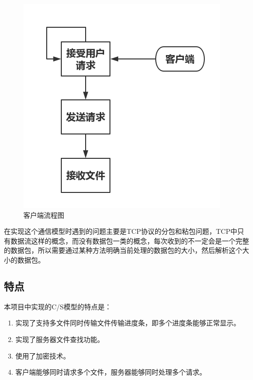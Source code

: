 \documentclass[15pt]{ctexart}
\begin{document}
\begin{figure}[H]
\begin{minipage}{0.45\linewidth}
		    		\includegraphics[width=1\linewidth]{imgs/client.png}
		    		\caption{客户端流程图}
		    		\label{fig:client}
	    		\end{minipage}
	    	\end{figure}
	    	\par 在实现这个通信模型时遇到的问题主要是TCP协议的分包和粘包问题，TCP中只有数据流这样的概念，而没有数据包一类的概念，每次收到的不一定会是一个完整的数据包，所以需要通过某种方法明确当前处理的数据包的大小，然后解析这个大小的数据包。
    	\subsection{特点} %
    	\label{sub:特点}
    		本项目中实现的C/S模型的特点是：
    		\begin{enumerate}
    			\item 实现了支持多文件同时传输文件传输进度条，即多个进度条能够正常显示。
    			\item 实现了服务器文件查找功能。
    			\item 使用了加密技术。
    			\item 客户端能够同时请求多个文件，服务器能够同时处理多个请求。
    		\end{enumerate}
    	
\end{document}
